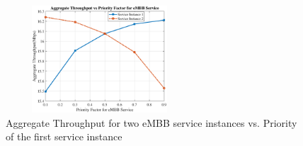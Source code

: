 \documentclass[lettersize,journal]{IEEEtran}
\begin{document}
\begin{figure}%
  \centering
  \captionsetup{justification=centering}
        \includegraphics[width=7cm,height=4cm]{priorityLast.eps}
  \caption{Aggregate Throughput for two eMBB service instances vs. Priority of the first service instance }
  \label{fig:9}

\end{figure}
\end{document}
